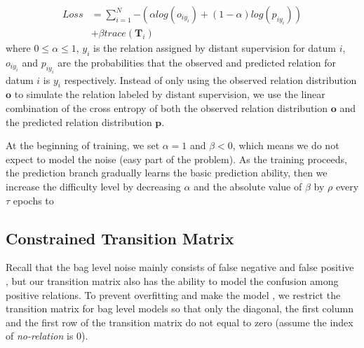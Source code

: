\begin{equation}
\begin{aligned}
Loss	&=\sum_{i=1}^N{-(\alpha log(o_{iy_{i}}) + (1-\alpha) log(p_{iy_{i}}))} \\
&+ \beta trace(\mathbf{T}_{i})
\end{aligned}
\end{equation}
where $0\le\alpha\le1$, $y_i$ is the relation assigned by distant supervision for datum $i$, $o_{iy_{i}}$ and $p_{iy_{i}}$ are the probabilities that the observed and predicted relation for datum $i$ is $y_i$ respectively. Instead of only using the observed relation distribution $\mathbf{o}$ to simulate the relation labeled by distant supervision, we use the linear combination of the cross entropy of both the observed relation distribution $\mathbf{o}$ and the predicted relation distribution $\mathbf{p}$.

At the beginning of training, we set $\alpha=1$ and $\beta<0$, which means we do not expect to model the noise (easy part of the problem). As the training proceeds, the prediction branch gradually learns the basic prediction ability,  then we increase the difficulty level by decreasing $\alpha$ and the absolute value of $\beta$ by $\rho$ every $\tau$ epochs to 

\subsection{Constrained Transition Matrix}
Recall that the bag level noise mainly consists of false negative and false positive , but our transition matrix also has the ability to model the confusion among positive relations. To prevent overfitting and make the model , we restrict the transition matrix for bag level models so that only the diagonal, the first column and the first row of the transition matrix do not equal to zero (assume the index of \emph{no-relation} is 0).
